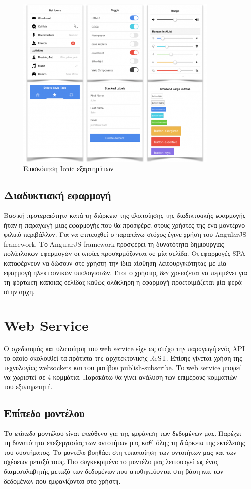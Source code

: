 \begin{figure}[h]
  \centering
  \includegraphics[width=100mm]{images/ionic.png}
  \caption{Επισκόπηση Ιonic εξαρτημάτων}
  \label{fig:ionic-modules}
\end{figure}

\newpage

\subsection{Διαδυκτιακή εφαρμογή}
Βασική προτεραιότητα κατά τη διάρκεια της υλοποίησης της διαδικτυακής εφαρμογής ήταν η παραγωγή μιας εφαρμογής που θα προσφέρει στους χρήστες της ένα μοντέρνο φιλικό περιβάλλον. Για να επιτευχθεί ο παραπάνω στόχος έγινε χρήση του AngularJS framework. Το AngularJS framework προσφέρει τη δυνατότητα δημιουργίας πολύπλοκων εφαρμογών οι οποίες προσαρμόζονται σε μία σελίδα. Οι εφαρμογές SPA καταφέρνουν να δώσουν στο χρήστη την ίδια αίσθηση λειτουργικότητας με μία εφαρμογή ηλεκτρονικών υπολογιστών. Έτσι ο χρήστης δεν χρειάζεται να περιμένει για τη φόρτωση κάποιας σελίδας καθώς ολόκληρη η εφαρμογή προετοιμάζεται μία φορά στην αρχή.

\section{Web Service}
Ο σχεδιασμός και υλοποίηση του web service είχε ως στόχο την παραγωγή ενός API το οποίο ακολουθεί τα πρότυπα της αρχιτεκτονικής ReST. Επίσης γίνεται χρήση της τεχνολογίας websockets και του μοτίβου publish-subscribe. Το web service μπορεί να χωριστεί σε 4 κομμάτια. Παρακάτω θα γίνει ανάλυση των επιμέρους κομματιών του εξυπηρετητή.  

\subsection{Επίπεδο μοντέλου}
Το επίπεδο μοντέλου είναι υπεύθυνο για της εμφάνιση των δεδομένων μας. Παρέχει τη δυνατότητα επεξεργασίας των οντοτήτων μας καθ' όλης τη διάρκεια της εκτέλεσης του συστήματος. Το μοντέλο βοηθάει στη τυποποίηση των οντοτήτων μας και των σχέσεων μεταξύ τους. Πιο συγκεκριμένα το μοντέλο μας λειτουργεί ως ένας διαμεσολαβητής μεταξύ των δεδομένων που αποθηκεύονται στη βάση και των δεδομένων που εμφανίζονται στο χρήστη. 

